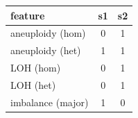 \documentclass{standalone}
\begin{document}
\begin{tabular}{|l|c|c|}
\toprule
\textbf{feature} & s1 & s2 \\
\midrule
aneuploidy (hom) & 0 & 1 \\
aneuploidy (het) & 1 & 1 \\
LOH (hom) & 0 & 1 \\
LOH (het) & 0 & 1 \\
imbalance (major) & 1 & 0 \\
\bottomrule
\end{tabular}
\end{document}
